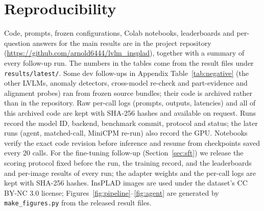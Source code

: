 \documentclass[11pt]{article}
\begin{document}
\section{Reproducibility}
Code, prompts, frozen configurations, Colab notebooks, leaderboards and per-question answers for the main results are in the project repository (\url{https://github.com/arnold6444/lvlm_insplad}), together with a summary of every follow-up run. The numbers in the tables come from the result files under \texttt{results/latest/}. Some dev follow-ups in Appendix Table~\ref{tab:negative} (the other LVLMs, anomaly detectors, cross-model re-check and part-evidence and alignment probes) ran from frozen source bundles; their code is archived rather than in the repository. Raw per-call logs (prompts, outputs, latencies) and all of this archived code are kept with SHA-256 hashes and available on request. Runs record the model ID, backend, benchmark commit, protocol and status; the later runs (agent, matched-call, MiniCPM re-run) also record the GPU. Notebooks verify the exact code revision before inference and resume from checkpoints saved every 20 calls. For the fine-tuning follow-up (Section~\ref{sec:sft}) we release the scoring protocol fixed before the run, the training record, and the leaderboards and per-image results of every run; the adapter weights and the per-call logs are kept with SHA-256 hashes. InsPLAD images are used under the dataset's CC BY-NC 3.0 license; Figures~\ref{fig:pipeline}--\ref{fig:agent} are generated by \texttt{make\_figures.py} from the released result files.
\end{document}
